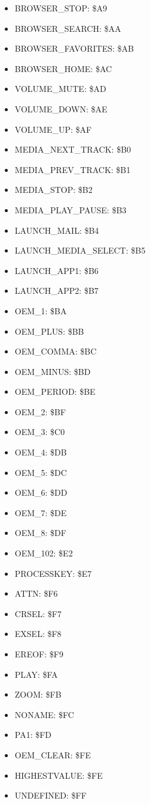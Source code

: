 \documentclass[a4paper]{report}
\begin{document}
\begin{itemize}
\item   BROWSER\_STOP: \$A9
\item   BROWSER\_SEARCH: \$AA
\item   BROWSER\_FAVORITES: \$AB
\item   BROWSER\_HOME: \$AC
\item   VOLUME\_MUTE: \$AD
\item   VOLUME\_DOWN: \$AE
\item   VOLUME\_UP: \$AF
\item   MEDIA\_NEXT\_TRACK: \$B0
\item   MEDIA\_PREV\_TRACK: \$B1
\item   MEDIA\_STOP: \$B2
\item   MEDIA\_PLAY\_PAUSE: \$B3
\item   LAUNCH\_MAIL: \$B4
\item   LAUNCH\_MEDIA\_SELECT: \$B5
\item   LAUNCH\_APP1: \$B6
\item   LAUNCH\_APP2: \$B7
\item   OEM\_1: \$BA
\item   OEM\_PLUS: \$BB
\item   OEM\_COMMA: \$BC
\item   OEM\_MINUS: \$BD
\item   OEM\_PERIOD: \$BE
\item   OEM\_2: \$BF
\item   OEM\_3: \$C0
\item   OEM\_4: \$DB
\item   OEM\_5: \$DC
\item   OEM\_6: \$DD
\item   OEM\_7: \$DE
\item   OEM\_8: \$DF
\item   OEM\_102: \$E2
\item   PROCESSKEY: \$E7
\item   ATTN: \$F6
\item   CRSEL: \$F7
\item   EXSEL: \$F8
\item   EREOF: \$F9
\item   PLAY: \$FA
\item   ZOOM: \$FB
\item   NONAME: \$FC
\item   PA1: \$FD
\item   OEM\_CLEAR: \$FE
\item   HIGHESTVALUE: \$FE
\item   UNDEFINED: \$FF
\end{itemize}
\end{document}
